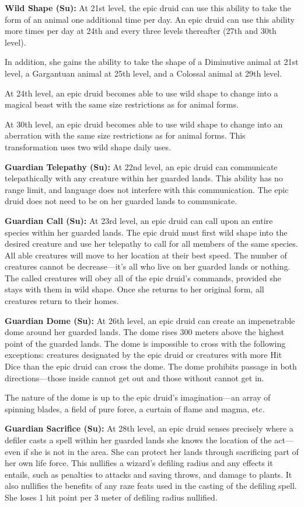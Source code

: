 \textbf{Wild Shape (Su):} At 21st level, the epic druid can use this ability to take the form of an animal one additional time per day. An epic druid can use this ability more times per day at 24th and every three levels thereafter (27th and 30th level).

In addition, she gains the ability to take the shape of a Diminutive animal at 21st level, a Gargantuan animal at 25th level, and a Colossal animal at 29th level.

At 24th level, an epic druid becomes able to use wild shape to change into a magical beast with the same size restrictions as for animal forms.

At 30th level, an epic druid becomes able to use wild shape to change into an aberration with the same size restrictions as for animal forms. This transformation uses two wild shape daily uses.

\textbf{Guardian Telepathy (Su):} At 22nd level, an epic druid can communicate telepathically with any creature within her guarded lands. This ability has no range limit, and language does not interfere with this communication. The epic druid does not need to be on her guarded lands to communicate.

\textbf{Guardian Call (Su):} At 23rd level, an epic druid can call upon an entire species within her guarded lands. The epic druid must first wild shape into the desired creature and use her telepathy to call for all members of the same species. All able creatures will move to her location at their best speed. The number of creatures cannot be decrease---it's all who live on her guarded lands or nothing. The called creatures will obey all of the epic druid's commands, provided she stays with them in wild shape. Once she returns to her original form, all creatures return to their homes.

\textbf{Guardian Dome (Su):} At 26th level, an epic druid can create an impenetrable dome around her guarded lands. The dome rises 300 meters above the highest point of the guarded lands. The dome is impossible to cross with the following exceptions: creatures designated by the epic druid or creatures with more Hit Dice than the epic druid can cross the dome. The dome prohibits passage in both directions---those inside cannot get out and those without cannot get in.

The nature of the dome is up to the epic druid's imagination---an array of spinning blades, a field of pure force, a curtain of flame and magma, etc.

\textbf{Guardian Sacrifice (Su):} At 28th level, an epic druid senses precisely where a defiler casts a spell within her guarded lands she knows the location of the act---even if she is not in the area. She can protect her lands through sacrificing part of her own life force. This nullifies a wizard's defiling radius and any effects it entails, such as penalties to attacks and saving throws, and damage to plants. It also nullifies the benefits of any raze feats used in the casting of the defiling spell. She loses 1 hit point per 3 meter of defiling radius nullified.
